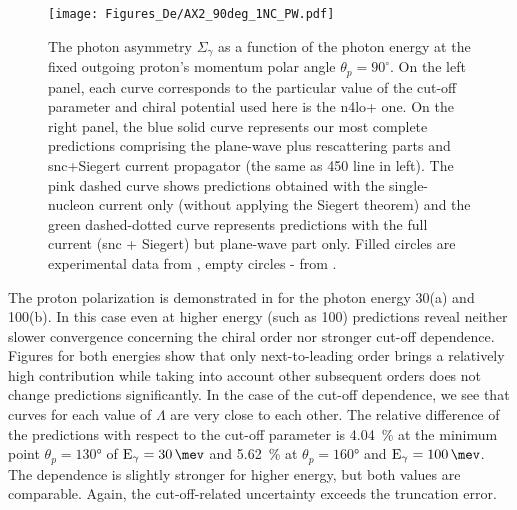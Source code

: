      
    \begin{figure}[h]
        \begin{center}
        \texttt{[image: Figures\_De/AX2\_90deg\_1NC\_PW.pdf]}
        \end{center}
        \caption{The photon asymmetry $\Sigma_\gamma$ 
        as a function of the photon energy  
        at the fixed outgoing proton's momentum polar angle $\theta_p=90^\circ$.
        On the left panel, each curve corresponds to the particular value of the cut-off parameter
        and chiral potential used here is the \gls{n4lo+} one.
        On the right panel, the blue solid curve represents our most complete predictions
        comprising the plane-wave plus rescattering parts and \gls{snc}+Siegert current propagator 
        (the same as \SI{450}{\mev} line in left).
        The pink dashed curve shows predictions obtained with
        the single-nucleon current only (without applying the Siegert theorem) and the green dashed-dotted
        curve represents predictions with the full current (\gls{snc} + Siegert) but plane-wave part only.
        Filled circles are experimental data from \cite{delbianco_1981},
        empty circles - from \cite{depascale_asymmetry}.}
        \label{asymmetry_90deg}
    \end{figure}


    The proton polarization is demonstrated in  for the 
    photon energy \SI{30}{\mev}(a) and \SI{100}{\mev}(b).
    In this case even at higher energy
    (such as \SI{100}{\mev}) predictions reveal neither slower convergence concerning the chiral order nor stronger cut-off dependence. Figures for both energies show
    that only next-to-leading order brings a relatively high contribution
    while taking into account other subsequent orders does not change predictions
    significantly. In the case of the cut-off dependence, we see that curves for each
    value of $\Lambda$ are very close to each other. 
    The relative difference of the predictions with respect to the cut-off parameter
    is \SI{4.04}{\percent} at the minimum point $\theta_p=\ang{130}$ of $\text{E}_\gamma = \SI{30}{\mev}$
    and \SI{5.62}{\percent} at $\theta_p=\ang{160}$ and $\text{E}_\gamma = \SI{100}{\mev}$.
    The dependence is slightly stronger for higher energy, but both values are comparable.
    Again, the cut-off-related uncertainty exceeds the truncation error.

